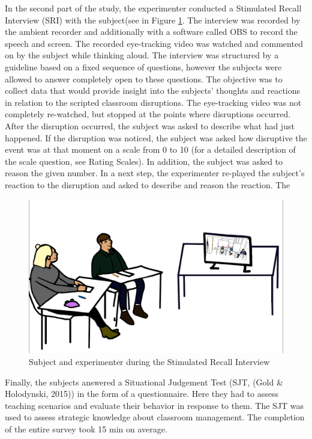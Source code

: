 \documentclass[
  man]{apa6}
\begin{document}
In the second part of the study, the experimenter conducted a Stimulated Recall Interview (SRI) with the subject(see in Figure \ref{fig:sri}. The interview was recorded by the ambient recorder and additionally with a software called OBS to record the speech and screen. The recorded eye-tracking video was watched and commented on by the subject while thinking aloud. The interview was structured by a guideline based on a fixed sequence of questions, however the subjects were allowed to answer completely open to these questions. The objective was to collect data that would provide insight into the subjects' thoughts and reactions in relation to the scripted classroom disruptions. The eye-tracking video was not completely re-watched, but stopped at the points where disruptions occurred. After the disruption occurred, the subject was asked to describe what had just happened. If the disruption was noticed, the subject was asked how disruptive the event was at that moment on a scale from 0 to 10 (for a detailed description of the scale question, see Rating Scales). In addition, the subject was asked to reason the given number. In a next step, the experimenter re-played the subject's reaction to the disruption and asked to describe and reason the reaction. The

\begin{figure}

{\centering \includegraphics{./pictures/sri} 

}

\caption{Subject and experimenter during the Stimulated Recall Interview}\label{fig:sri}
\end{figure}

Finally, the subjects answered a Situational Judgement Test (SJT, (Gold \& Holodynski, 2015)) in the form of a questionnaire. Here they had to assess teaching scenarios and evaluate their behavior in response to them. The SJT was used to assess strategic knowledge about classroom management. The
completion of the entire survey took 15 min on average.
\end{document}
